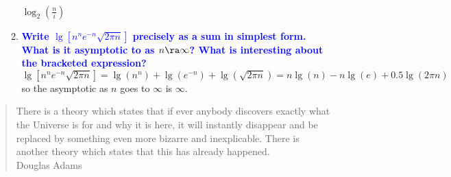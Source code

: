 \documentclass[11pt]{article}
\begin{document}
\begin{enumerate}
\begin{enumerate}
        \\ $\log_2(\frac{n}{i})$
    \item \textbf{\textcolor{blue}{Write $\lg[n^ne^{-n}\sqrt{2\pi n}]$ precisely as a sum in simplest form.  What is it asymptotic to as $n\ra \infty$?  What is interesting about the bracketed expression?}}
        \\ $\lg[n^ne^{-n}\sqrt{2\pi n}] = \lg(n^n) + \lg(e^{-n}) + \lg(\sqrt{2\pi n}) = n\lg(n) - n\lg(e) + 0.5\lg(2\pi n)$ so the asymptotic as $n$ goes to $\infty$ is $\infty$.
    \end{enumerate}
\end{enumerate}

\begin{quote}
There is a theory which states that if ever anybody discovers exactly what
the Universe is for and why it is here, it will instantly disappear and be
replaced by something even more bizarre and inexplicable. There is another
theory which states that this has already happened.
\\ Douglas Adams
\end{quote}
\end{document}

